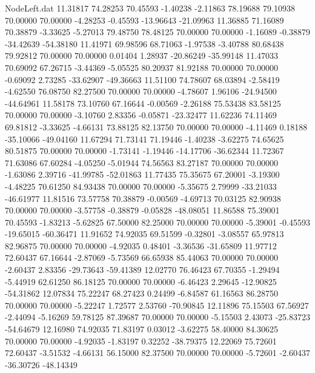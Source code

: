 \begin{filecontents}{NodeLeft.dat}
  11.31817   74.28253   70.45593    -1.40238   -2.11863   78.19688   79.10938   70.00000   70.00000   -4.28253   -0.45593  -13.96643  -21.09963
  11.36885   71.16089   70.38879    -3.33625   -5.27013   79.48750   78.48125   70.00000   70.00000   -1.16089   -0.38879  -34.42639  -54.38180
  11.41971   69.98596   68.71063    -1.97538   -3.40788   80.68438   79.92812   70.00000   70.00000    0.01404    1.28937  -20.86249  -35.99148
  11.47033   70.69092   67.26715    -3.44369   -5.05525   80.20937   81.92188   70.00000   70.00000   -0.69092    2.73285  -33.62907  -49.36663
  11.51100   74.78607   68.03894    -2.58419   -4.62550   76.08750   82.27500   70.00000   70.00000   -4.78607    1.96106  -24.94500  -44.64961
  11.58178   73.10760   67.16644    -0.00569   -2.26188   75.53438   83.58125   70.00000   70.00000   -3.10760    2.83356   -0.05871  -23.32477
  11.62236   74.11469   69.81812    -3.33625   -4.66131   73.88125   82.13750   70.00000   70.00000   -4.11469    0.18188  -35.10066  -49.04160
  11.67294   71.73141   71.19446    -1.40238   -3.62275   74.65625   80.51875   70.00000   70.00000   -1.73141   -1.19446  -14.17706  -36.62344
  11.72367   71.63086   67.60284    -4.05250   -5.01944   74.56563   83.27187   70.00000   70.00000   -1.63086    2.39716  -41.99785  -52.01863
  11.77435   75.35675   67.20001    -3.19300   -4.48225   70.61250   84.93438   70.00000   70.00000   -5.35675    2.79999  -33.21033  -46.61977
  11.81516   73.57758   70.38879    -0.00569   -4.69713   70.03125   82.90938   70.00000   70.00000   -3.57758   -0.38879   -0.05828  -48.08051
  11.86588   75.39001   70.45593    -1.83213   -5.62825   67.50000   82.25000   70.00000   70.00000   -5.39001   -0.45593  -19.65015  -60.36471
  11.91652   74.92035   69.51599    -0.32801   -3.08557   65.97813   82.96875   70.00000   70.00000   -4.92035    0.48401   -3.36536  -31.65809
  11.97712   72.60437   67.16644    -2.87069   -5.73569   66.65938   85.44063   70.00000   70.00000   -2.60437    2.83356  -29.73643  -59.41389
  12.02770   76.46423   67.70355    -1.29494   -5.44919   62.61250   86.18125   70.00000   70.00000   -6.46423    2.29645  -12.90825  -54.31862
  12.07834   75.22247   68.27423     0.24499   -6.84587   61.16563   86.28750   70.00000   70.00000   -5.22247    1.72577    2.53760  -70.90845
  12.11896   75.15503   67.56927    -2.44094   -5.16269   59.78125   87.39687   70.00000   70.00000   -5.15503    2.43073  -25.83723  -54.64679
  12.16980   74.92035   71.83197     0.03012   -3.62275   58.40000   84.30625   70.00000   70.00000   -4.92035   -1.83197    0.32252  -38.79375
  12.22069   75.72601   72.60437    -3.51532   -4.66131   56.15000   82.37500   70.00000   70.00000   -5.72601   -2.60437  -36.30726  -48.14349

\end{filecontents}
